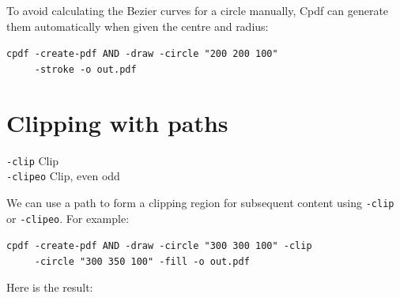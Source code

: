 \documentclass{book}
\begin{document}
To avoid calculating the Bezier curves for a circle manually, Cpdf can generate them automatically when given the centre and radius:

\begin{framed}
 \noindent\small\verb?cpdf -create-pdf AND -draw -circle "200 200 100"?\\
 \noindent\small\verb?     -stroke -o out.pdf?
\end{framed}

\section{Clipping with paths}
  {\small\begin{framed}
   \noindent\verb!-clip! Clip\\
   \noindent\verb!-clipeo! Clip, even odd
  \end{framed}}

\noindent We can use a path to form a clipping region for subsequent content using \texttt{-clip} or \texttt{-clipeo}. For example: 

\begin{framed}
 \noindent\small\verb?cpdf -create-pdf AND -draw -circle "300 300 100" -clip?\\
 \noindent\small\verb?     -circle "300 350 100" -fill -o out.pdf?
\end{framed}

\noindent Here is the result:
\end{document}
